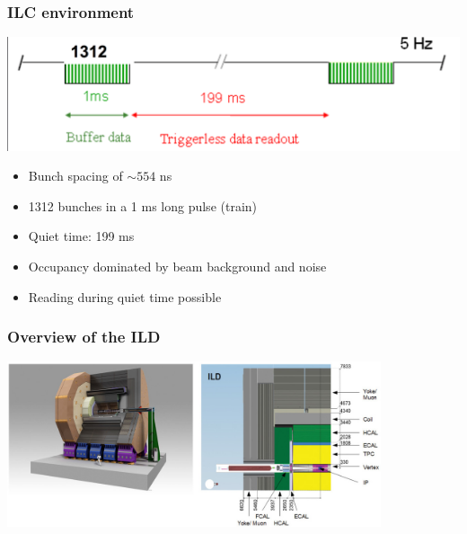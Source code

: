 \documentclass{beamer}
\begin{document}

  \begin{frame}[plain,label=power-pulsing]
    \frametitle{ILC environment}

    \begin{center}
    \includegraphics[width = \textwidth]{Pictures/bunchTrainILC.png}
    \end{center}

    \begin{itemize}
      \item Bunch spacing of $\sim 554$ ns
      \item 1312 bunches in a 1 ms long pulse (train)
      \item Quiet time: 199 ms
      \item Occupancy dominated by beam background and noise
      \item Reading during quiet time possible
    \end{itemize}

  \end{frame}


\begin{frame}[plain]
    \frametitle{Overview of the ILD}

    \begin{center}
        \includegraphics[width = 11cm]{Pictures/ild-detector-ilc.jpg}
    \end{center}
\end{frame}

\end{document}
